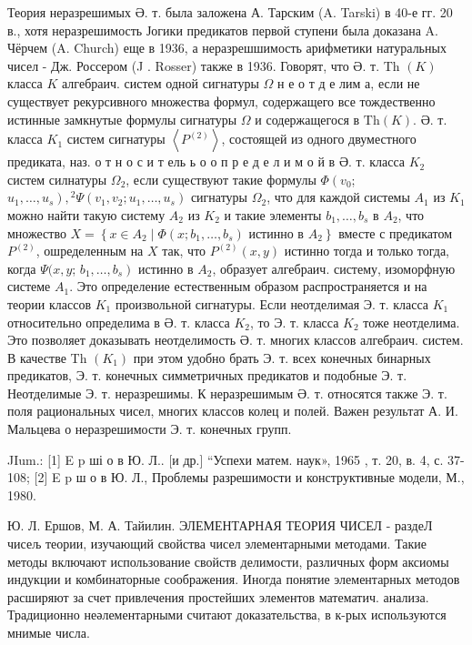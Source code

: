 \documentclass[10pt]{article}
\begin{document}
Теория неразрешимых Ә. т. была заложена А. Тарским (A. Tarski) в 40-е гг. 20 в., хотя неразрешимость Јогики предикатов первой ступени была доказана A. Чёрчем (A. Church) еще в 1936, а неразрешшимость арифметики натуральных чисел - Дж. Россером (J . Rosser) также в 1936. Говорят, что Ә. т. Th $(K)$ класса $K$ алгебраич. систем одной сигнатуры $\Omega$ н е о т д е лим а, если не существует рекурсивного множества формул, содержащего все тождественно истинные замкнутые формулы сигнатуры $\Omega$ и содержащегося в $\mathrm{Th}(K)$. Ә. т. класса $K_{1}$ систем сигнатуры $\left\langle P^{(2)}\right\rangle$, состоящей из одного двуместного предиката, наз. о т н о с и т ель ь о о п р е д е л и м о й в Ә. т. класса $K_{2}$ систем силнатуры $\Omega_{2}$, если существуют такие формулы $\Phi\left(v_{0}\right.$; $\left.u_{1}, \ldots, u_{s}\right),{ }^{2} \Psi\left(v_{1}, v_{2} ; u_{1}, \ldots, u_{s}\right)$ сигнатуры $\Omega_{2}$, что для каждой системы $A_{1}$ из $K_{1}$ можно найти такую систему $A_{2}$ из $K_{2}$ и такие элементы $b_{1}, \ldots, b_{s}$ в $A_{2}$, что множество $X=\left\{x \in A_{2} \mid \Phi\left(x ; b_{1}, \ldots, b_{s}\right)\right.$ истинно в $\left.A_{2}\right\}$ вместе с предикатом $P^{(2)}$, ошределенным на $X$ так, что $P^{(2)}(x, y)$ истинно тогда и только тогда, когда $\Psi(x, y$; $\left.b_{1}, \ldots, b_{s}\right)$ истинно в $A_{2}$, образует алгебраич. систему, изоморфную системе $A_{1}$. Это определение естественным образом распространяется и на теории классов $K_{1}$ произвольной сигнатуры. Если неотделимая Э. т. класса $K_{1}$ относительно определима в Ә. т. класса $K_{2}$, то Э. т. класса $K_{2}$ тоже неотделима. Это позволяет доказывать неотделимость Ә. т. многих классов алгебраич. систем. В качестве Th $\left(K_{1}\right)$ при этом удобно брать Э. т. всех конечных бинарных предикатов, Э. т. конечных симметричных предикатов и подобные Э. т. Неотделимые Э. т. неразрешимы. К неразрешимым Ә. т. относятся также Э. т. поля рациональных чисел, многих классов колец и полей. Важен результат А. И. Мальцева о неразрешимости Э. т. конечных групп.



JIum.: [1] E p ші о в Ю. Л.. [и др.] “Успехи матем. наук», 1965 , т. 20, в. 4, с. 37-108; [2] E p ш о в Ю. Л., Проблемы разрешимости и конструктивные модели, М., 1980.



Ю. Л. Ершов, М. А. Тайилин. ЭЛЕМЕНТАРНАЯ ТЕОРИЯ ЧИСЕЛ - раздеЛ чисељ теории, изучающий свойства чисел элементарными методами. Такие методы включают использование свойств делимости, различных форм аксиомы индукции и комбинаторные соображения. Иногда понятие элементарных методов расширяют за счет привлечения простейших элементов математич. анализа. Традиционно неәлементарными считают доказательства, в к-рых используются мнимые числа.
\end{document}
